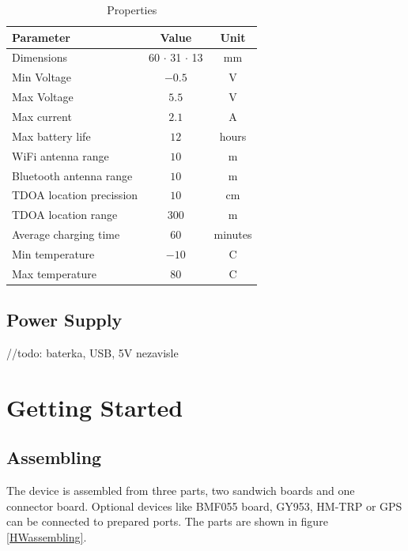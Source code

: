 \begin{table}[H]
	\centering
	\begin{tabular}{|l|c|c|}
		\hline
		Parameter & Value & Unit \\
		\hline \hline
		Dimensions & 60 $\cdot$ 31 $\cdot$ 13 & mm \\
		Min Voltage & $-0.5$ & V \\
		Max Voltage & $5.5$ & V \\
		Max current & $2.1$ & A \\
		Max battery life & $12$ & hours \\
		WiFi antenna range & $10$ & m \\
		Bluetooth antenna range & $10$ & m \\
		TDOA location precission & $10$ & cm \\
		TDOA location range & $300$ & m \\
		Average charging time & $60$ & minutes \\
		Min temperature & $-10$ & \degree C \\
		Max temperature & $80$ & \degree C \\
		\hline
	\end{tabular}
	\caption{Properties}
	\label{HWmaxRatings}
\end{table}

\subsection{Power Supply}
//todo: baterka, USB, 5V nezavisle

\section{Getting Started}

\subsection{Assembling}
The device is assembled from three parts, two sandwich boards and one connector board. Optional devices like BMF055 board, GY953, HM-TRP or GPS can be connected to prepared ports. The parts are shown in figure \ref{HWassembling}.

